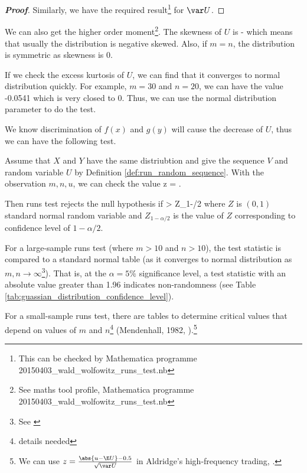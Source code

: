 \begin{proof}[\bf Proof]
Similarly, we have the required result\footnote{This can be checked by Mathematica programme 20150403\_wald\_wolfowitz\_runs\_test.nb} for $\var U$.
\end{proof}

\begin{remark}
We can also get the higher order moment\footnote{See maths tool profile, Mathematica programme 20150403\_wald\_wolfowitz\_runs\_test.nb}. The skewness of $U$ is
\be
-
\ee
which means that usually the distribution is negative skewed. Also, if $m=n$, the distribution is symmetric as skewness is 0.

If we check the excess kurtosis of $U$, we can find that it converges to normal distribution quickly. For example, $m=30$ and $n=20$, we can have the value -0.0541 which is very closed to 0. Thus, we can use the normal distribution parameter to do the test.
\end{remark}

We know discrimination of $f(x)$ and $g(y)$ will cause the decrease of $U$, thus we can have the following test.%

\begin{proposition}\label{pro:wald_wolfowitz_runs_test}
Assume that $X$ and $Y$ have the same distriubtion and give the sequence $V$ and random variable $U$ by Definition \ref{def:run_random_sequence}. With the observation $m,n,u$, we can check the value
\be
z = .
\ee

Then runs test rejects the null hypothesis if
\be
{} > Z_{1-\alpha/2}
\ee
where $Z$ is $(0,1)$ standard normal random variable and $Z_{1-\alpha/2}$ is the value of $Z$ corresponding to confidence level of $1-\alpha/2$.


For a large-sample runs test (where $m > 10$ and $n > 10$), the test statistic is compared to a standard normal table (as it converges to normal distribution as $m,n\to \infty$\footnote{See \cite{Wald_Wolfowitz_1940}}). That is, at the $\alpha = 5\%$ significance level, a test statistic with an absolute value greater than 1.96 indicates non-randomness (see Table \ref{tab:guassian_distribution_confidence_level}).

For a small-sample runs test, there are tables to determine critical values that depend on values of $m$ and $n$\footnote{details needed} (Mendenhall, 1982, \cite{Mendenhall_Reinmuth_1982}).\footnote{We can use $z = \frac{\abs{u - \E U}-0.5}{\sqrt{\var U}}$ in Aldridge's high-frequency trading, \cite{Aldridge_2013}.}%
\end{proposition}

